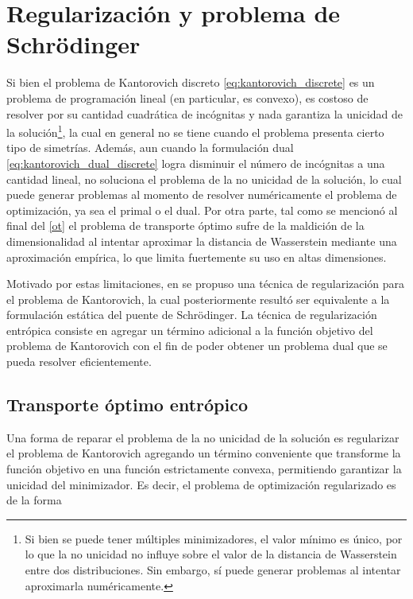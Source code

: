 \chapter{Regularización y problema de Schrödinger}
\label{eot_sbp}

Si bien el problema de Kantorovich discreto \eqref{eq:kantorovich_discrete} es un problema de programación lineal (en particular, es convexo), es costoso de resolver por su cantidad cuadrática de incógnitas y nada garantiza la unicidad de la solución\footnote{Si bien se puede tener múltiples minimizadores, el valor mínimo es único, por lo que la no unicidad no influye sobre el valor de la distancia de Wasserstein entre dos distribuciones. Sin embargo, sí puede generar problemas al intentar aproximarla numéricamente.}, la cual en general no se tiene cuando el problema presenta cierto tipo de simetrías. Además, aun cuando la formulación dual \eqref{eq:kantorovich_dual_discrete} logra disminuir el número de incógnitas a una cantidad lineal, no soluciona el problema de la no unicidad de la solución, lo cual puede generar problemas al momento de resolver numéricamente el problema de optimización, ya sea el primal o el dual. Por otra parte, tal como se mencionó al final del \autoref{ot} el problema de transporte óptimo sufre de la maldición de la dimensionalidad al intentar aproximar la distancia de Wasserstein mediante una aproximación empírica, lo que limita fuertemente su uso en altas dimensiones.

Motivado por estas limitaciones, en \cite{cuturi2013sinkhorn} se propuso una técnica de regularización para el problema de Kantorovich, la cual posteriormente resultó ser equivalente a la formulación estática del puente de Schrödinger. La técnica de regularización entrópica consiste en agregar un término adicional a la función objetivo del problema de Kantorovich con el fin de poder obtener un problema dual que se pueda resolver eficientemente.

\section{Transporte óptimo entrópico}
\label{eot_sbp/regularized}

Una forma de reparar el problema de la no unicidad de la solución es regularizar el problema de Kantorovich agregando un término conveniente que transforme la función objetivo en una función estrictamente convexa, permitiendo garantizar la unicidad del minimizador. Es decir, el problema de optimización regularizado es de la forma

